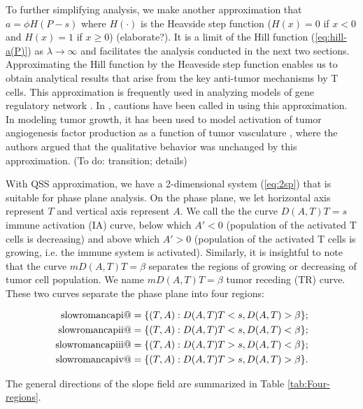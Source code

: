 \documentclass[review,authoryear]{elsarticle}
\makeatletter
\newcommand*{\rom}[1]{\expandafter\@slowromancap\romannumeral #1@}
\makeatother
\begin{document}
To further simplifying analysis, we make another approximation that $a=\phi H(P-s)$
where $H(\cdot)$ is the Heavside step function ($H(x)=0$ if $x<0$
and $H(x)=1$ if $x\ge0$) (elaborate?). It is a limit of the Hill
function (\ref{eq:hill-a(P)}) as $\lambda\to\infty$ and facilitates the analysis conducted
in the next two sections. Approximating the Hill function by the Heaveside
step function enables us to obtain analytical results that arise from
the key anti-tumor mechanisms by T cells. This approximation
is frequently used in analyzing models of gene regulatory network
 \citep[e.g.][]{Glass1973,Mestl1995}. In \citet{Polynikis2009},
cautions have been called in using this approximation. In modeling
tumor growth, it has been used to model activation of tumor angiogenesis
factor production as a function of tumor vasculature \citep{Stamper2007},
where the authors argued that the qualitative behavior was unchanged
by this approximation. (To do: transition; details)

With QSS approximation, we have a 2-dimensional system (\ref{eq:2sp}) that is suitable
for phase plane analysis. On the phase plane, we let horizontal axis
represent $T$ and vertical axis represent $A$. We call the the curve
$D(A,T)T=s$ immune activation (IA) curve, below which $A'<0$ (population
of the activated T cells is decreasing) and above which $A'>0$ (population
of the activated T cells is growing, i.e. the immune system is activated).
Similarly, it is insightful to note that the curve $mD(A,T)T=\beta$
separates the regions of  growing or decreasing of tumor cell population. We name
$mD(A,T)T=\beta$ tumor receding (TR) curve. These two curves separate
the phase plane into four regions: 
\begin{linenomath*}
\begin{align*} 
\text{\rom{1}} &=  \{(T,A): D(A,T)T<s, D(A,T)>\beta \}; \\ 
\text{\rom{2}} &=  \{(T,A): D(A,T)T<s, D(A,T)<\beta \}; \\ 
\text{\rom{3}} &=  \{(T,A): D(A,T)T>s, D(A,T)<\beta \}; \\ 
\text{\rom{4}} &=  \{(T,A): D(A,T)T>s, D(A,T)>\beta \}. 
\end{align*}
\end{linenomath*}
The general directions of the slope field are summarized in Table \ref{tab:Four-regions}. 
\end{document}
